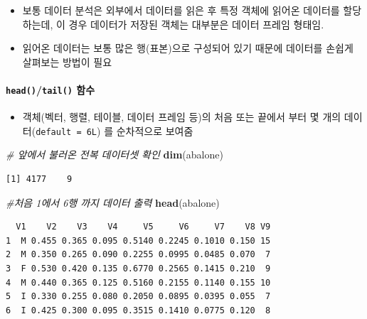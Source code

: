\documentclass[
  11pt,
]{krantz}
\newenvironment{Shaded}{\begin{snugshade}}{\end{snugshade}}
\newcommand{\CommentTok}[1]{\textcolor[rgb]{0.37,0.37,0.37}{\textit{#1}}}
\newcommand{\KeywordTok}[1]{\textcolor[rgb]{0.27,0.27,0.27}{\textbf{#1}}}
\newcommand{\NormalTok}[1]{#1}
\providecommand{\tightlist}{%
  \setlength{\itemsep}{0pt}\setlength{\parskip}{0pt}}
\begin{document}
\begin{itemize}
\tightlist
\item
  보통 데이터 분석은 외부에서 데이터를 읽은 후 특정 객체에 읽어온 데이터를 할당하는데, 이 경우 데이터가 저장된 객체는 대부분은 데이터 프레임 형태임.
\item
  읽어온 데이터는 보통 많은 행(표본)으로 구성되어 있기 때문에 데이터를 손쉽게 살펴보는 방법이 필요
\end{itemize}

\hypertarget{head-tail}{%
\paragraph{\texorpdfstring{\texttt{head()}/\texttt{tail()} 함수}{head()/tail() 함수}}\label{head-tail}}

\begin{itemize}
\tightlist
\item
  객체(벡터, 행렬, 테이블, 데이터 프레임 등)의 처음 또는 끝에서 부터 몇 개의 데이터(\texttt{default\ =\ 6L}) 를 순차적으로 보여줌
\end{itemize}

\footnotesize

\begin{Shaded}
\begin{Highlighting}[]
\CommentTok{# 앞에서 불러온 전복 데이터셋 확인}
\KeywordTok{dim}\NormalTok{(abalone)}
\end{Highlighting}
\end{Shaded}

\begin{verbatim}
[1] 4177    9
\end{verbatim}

\begin{Shaded}
\begin{Highlighting}[]
\CommentTok{#처음 1에서 6행 까지 데이터 출력}
\KeywordTok{head}\NormalTok{(abalone)}
\end{Highlighting}
\end{Shaded}

\begin{verbatim}
  V1    V2    V3    V4     V5     V6     V7    V8 V9
1  M 0.455 0.365 0.095 0.5140 0.2245 0.1010 0.150 15
2  M 0.350 0.265 0.090 0.2255 0.0995 0.0485 0.070  7
3  F 0.530 0.420 0.135 0.6770 0.2565 0.1415 0.210  9
4  M 0.440 0.365 0.125 0.5160 0.2155 0.1140 0.155 10
5  I 0.330 0.255 0.080 0.2050 0.0895 0.0395 0.055  7
6  I 0.425 0.300 0.095 0.3515 0.1410 0.0775 0.120  8
\end{verbatim}
\end{document}
